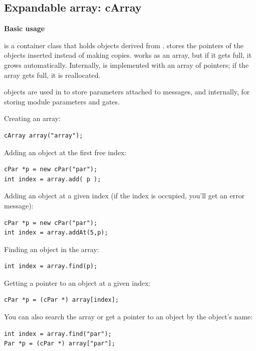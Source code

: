 \subsection{Expandable array: cArray}

\textbf{Basic usage}


 is a container class that holds objects derived from
.  stores the pointers of the objects
inserted instead of making copies.  works as an array,
but if it gets full, it grows automatically. Internally,
 is implemented with an array of pointers; if the array
gets full, it is reallocated.

 objects are used in {\opp} to store parameters
attached to messages, and internally, for storing module parameters
and gates.


Creating an array:

\begin{Verbatim}
cArray array("array");
\end{Verbatim}

Adding an object at the first free index:

\begin{Verbatim}
cPar *p = new cPar("par");
int index = array.add( p );
\end{Verbatim}


Adding an object at a given index (if the index is occupied, 
you'll get an error message):

\begin{Verbatim}
cPar *p = new cPar("par");
int index = array.addAt(5,p);
\end{Verbatim}


Finding an object in the array:

\begin{Verbatim}
int index = array.find(p);
\end{Verbatim}

Getting a pointer to an object at a given index:

\begin{Verbatim}
cPar *p = (cPar *) array[index]; 
\end{Verbatim}

You can also search the array or get a pointer to an object by 
the object's name:

\begin{Verbatim}
int index = array.find("par");
Par *p = (cPar *) array["par"];
\end{Verbatim}


